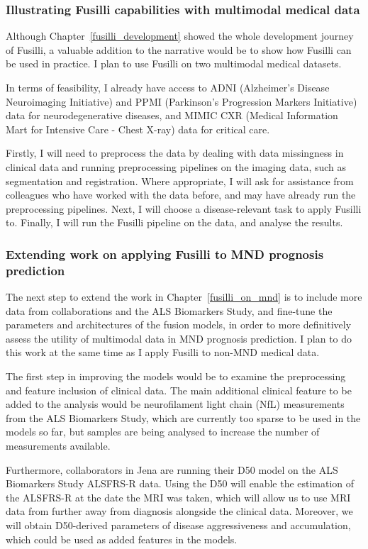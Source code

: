\subsubsection*{Illustrating Fusilli capabilities with multimodal medical data}

Although Chapter~\ref{fusilli_development} showed the whole development journey of Fusilli, a valuable addition to the narrative would be to show how Fusilli can be used in practice.
I plan to use Fusilli on two multimodal medical datasets.

In terms of feasibility, I already have access to ADNI (Alzheimer's Disease Neuroimaging Initiative) and PPMI (Parkinson's Progression Markers Initiative) data for neurodegenerative diseases, and MIMIC CXR (Medical Information Mart for Intensive Care - Chest X-ray) data for critical care.

Firstly, I will need to preprocess the data by dealing with data missingness in clinical data and running preprocessing pipelines on the imaging data, such as segmentation and registration.
Where appropriate, I will ask for assistance from colleagues who have worked with the data before, and may have already run the preprocessing pipelines.
Next, I will choose a disease-relevant task to apply Fusilli to.
Finally, I will run the Fusilli pipeline on the data, and analyse the results.

\subsubsection*{Extending work on applying Fusilli to MND prognosis prediction}

The next step to extend the work in Chapter~\ref{fusilli_on_mnd} is to include more data from collaborations and the ALS Biomarkers Study, and fine-tune the parameters and architectures of the fusion models, in order to more definitively assess the utility of multimodal data in MND prognosis prediction.
I plan to do this work at the same time as I apply Fusilli to non-MND medical data.

The first step in improving the models would be to examine the preprocessing and feature inclusion of clinical data.
The main additional clinical feature to be added to the analysis would be neurofilament light chain (NfL) measurements from the ALS Biomarkers Study, which are currently too sparse to be used in the models so far, but samples are being analysed to increase the number of measurements available.

Furthermore, collaborators in Jena are running their D50 model on the ALS Biomarkers Study ALSFRS-R data.
Using the D50 will enable the estimation of the ALSFRS-R at the date the MRI was taken, which will allow us to use MRI data from further away from diagnosis alongside the clinical data.
Moreover, we will obtain D50-derived parameters of disease aggressiveness and accumulation, which could be used as added features in the models.

